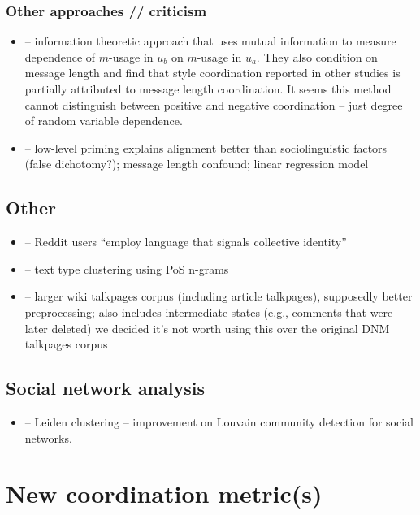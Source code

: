 \documentclass[12pt]{scrartcl}
\newcommand{\bill}[1]{\textcolor{Dandelion}{#1}}
\begin{document}
\subsubsection{Other approaches // criticism}
\begin{itemize}
  \item \cite{gao_understanding_2015} -- information theoretic approach that uses mutual information to measure dependence of $m$-usage in $u_b$ on $m$-usage in $u_a$. They also condition on message length and find that style coordination reported in other studies is partially attributed to message length coordination. \bill{It seems this method cannot distinguish between positive and negative coordination -- just degree of random variable dependence}.
  \item \cite{xu_not_2018} -- low-level priming explains alignment better than sociolinguistic factors \bill{(false dichotomy?)}; message length confound; linear regression model
\end{itemize}

\subsection{Other}
\begin{itemize}
  \item \cite{hamilton_loyalty_2017} -- Reddit users ``employ language that signals collective identity''
  \item \cite{cocco_discourse_2012} -- text type clustering using PoS n-grams 
  \item \cite{hua_wikiconv:_2018} -- larger wiki talkpages corpus (including article talkpages), supposedly better preprocessing; also includes intermediate states (e.g., comments that were later deleted) \bill{we decided it's not worth using this over the original DNM talkpages corpus}
\end{itemize}

\subsection{Social network analysis}
\begin{itemize}
  \item \cite{traag_louvain_2018} -- Leiden clustering -- improvement on Louvain community detection for social networks.
\end{itemize}


\section{New coordination metric(s)}
\end{document}
